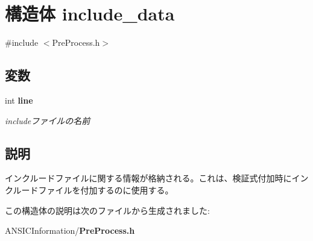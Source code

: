 \section{構造体 include\_\-data}
\label{structinclude__data}


{\ttfamily \#include $<$PreProcess.h$>$}

\subsection*{変数}
\begin{DoxyCompactItemize}
\item 
int {\bf line}\label{structinclude__data_a45201a24f55b5f41717179ce2de083aa}

\begin{DoxyCompactList}\small\item\em includeファイルの名前 \item\end{DoxyCompactList}\end{DoxyCompactItemize}


\subsection{説明}
インクルードファイルに関する情報が格納される。これは、検証式付加時にインクルードファイルを付加するのに使用する。 

この構造体の説明は次のファイルから生成されました:\begin{DoxyCompactItemize}
\item 
ANSICInformation/{\bf PreProcess.h}\end{DoxyCompactItemize}
